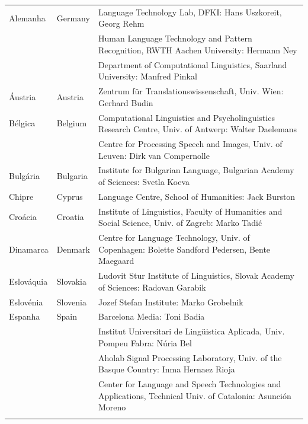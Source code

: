 \small
\begin{longtable}{llp{105mm}}
  Alemanha & \textcolor{grey1}{Germany} & Language Technology Lab, DFKI: Hans Uszkoreit, Georg Rehm \\ \addlinespace
  & & Human Language Technology and Pattern Recognition, RWTH Aachen University: Hermann Ney \\ \addlinespace
  & & Department of Computational Linguistics, Saarland University: Manfred Pinkal \\ \addlinespace 
  Áustria & \textcolor{grey1}{Austria} & Zentrum für Translationswissenschaft, Univ. Wien: Gerhard Budin \\ \addlinespace 
  Bélgica & \textcolor{grey1}{Belgium} & Computational Linguistics and Psycholinguistics Research Centre, Univ. of Antwerp: Walter Daelemans \\ \addlinespace
  & & Centre for Processing Speech and Images, Univ. of Leuven: Dirk van Compernolle \\ \addlinespace
  Bulgária & \textcolor{grey1}{Bulgaria} & Institute for Bulgarian Language, Bulgarian Academy of Sciences: Svetla Koeva \\ \addlinespace
  Chipre & \textcolor{grey1}{Cyprus} & Language Centre, School of Humanities: Jack Burston \\ \addlinespace
  Croácia & \textcolor{grey1}{Croatia} & Institute of Linguistics, Faculty of Humanities and Social Science, Univ. of Zagreb: Marko Tadić \\ \addlinespace
  Dinamarca &  \textcolor{grey1}{Denmark} & Centre for Language Technology, Univ. of Copenhagen: Bolette Sandford Pedersen, Bente Maegaard \\ \addlinespace
  Eslováquia & \textcolor{grey1}{Slovakia} & Ludovit Stur Institute of Linguistics, Slovak Academy of Sciences: Radovan Garabik \\ \addlinespace 
  Eslovénia & \textcolor{grey1}{Slovenia} & Jozef Stefan Institute: Marko Grobelnik \\ \addlinespace 
  Espanha & \textcolor{grey1}{Spain} & Barcelona Media: Toni Badia \\ \addlinespace 
  & & Institut Universitari de Lingüistica Aplicada, Univ. Pompeu Fabra: Núria Bel \\ \addlinespace 
  & & Aholab Signal Processing Laboratory, Univ. of the Basque Country: Inma Hernaez Rioja \\ \addlinespace 
  & & Center for Language and Speech Technologies and Applications, Technical Univ. of Catalonia: Asunción Moreno \\ \addlinespace 

\end{longtable}
